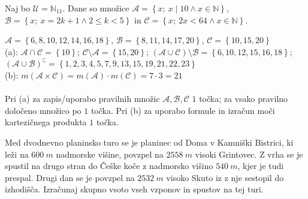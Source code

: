 \documentclass[addpoints]{exam}
\begin{document}
\begin{questions}
    \newpage

    \question
    Naj bo $\mathcal{U}=\mathbb{N}_{11}$. Dane so množice $\mathcal{A}=\left\{x;\ x\mid 10 \land x\in\mathbb{N}\right\}$, $\mathcal{B}=\left\{x;\ x=2k+1 \land 2\leq k< 5\right\}$ in $\mathcal{C}=\left\{x;\ 2x<64 \land x\in\mathbb{N}\right\}$. 

    \begin{solution}[13cm]
        $\mathcal{A}=\left\{6,8,10,12,14,16,18\right\}$, $\mathcal{B}=\left\{8,11,14,17,20\right\}$, $\mathcal{C}=\left\{10,15,20\right\}$ \\
        (a): $\mathcal{A}\cap\mathcal{C}=\left\{10\right\}$; $\mathcal{C}\setminus\mathcal{A}=\left\{15,20\right\}$; $(\mathcal{A}\cup\mathcal{C})\setminus\mathcal{B}=\left\{6,10,12,15,16,18\right\}$; $(\mathcal{A}\cup\mathcal{B})^\complement=\left\{1,2,3,4,5,7,9,13,15,19,21,22,23\right\}$ \\
        (b): $m(\mathcal{A}\times\mathcal{C})=m(\mathcal{A})\cdot m(\mathcal{C})=7\cdot 3 = 21$ \\ \\
        Pri (a) za zapis/uporabo pravilnih množic $\mathcal{A}, \mathcal{B}, \mathcal{C}$ $1$ točka; za vsako pravilno določeno množico po $1$ točka. Pri (b) za uporabo formule in izračun moči kartezičnega produkta $1$ točka.
    \end{solution}


        

    \question[3]
    Med dvodnevno planinsko turo se je planinec od Doma v Kamniški Bistrici, ki leži na $600~m$ 
    nadmorske višine, povzpel na $2558~m$ visoki Grintovec. Z vrha se je spustil na 
    drugo stran do Češke koče z nadmorsko višino $540~m$, kjer je tudi prespal. Drugi dan se 
    je povzpel na $2532~m$ visoko Skuto iz z nje sestopil do izhodišča. Izračunaj skupno vsoto 
    vseh vzponov in spustov na tej turi.


\end{questions}
\end{document}
